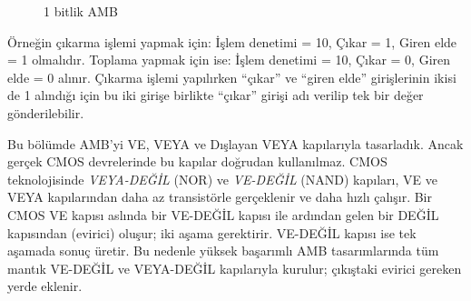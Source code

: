 \begin{figure}[htbp]
\caption{1 bitlik AMB}
\label{fig:1bit-amb}
\end{figure}

Örneğin çıkarma işlemi yapmak için: İşlem denetimi = 10, Çıkar = 1, Giren elde = 1 olmalıdır. Toplama yapmak için ise: İşlem denetimi = 10, Çıkar = 0, Giren elde = 0 alınır. Çıkarma işlemi yapılırken ``çıkar'' ve ``giren elde'' girişlerinin ikisi de 1 alındığı için bu iki girişe birlikte ``çıkar'' girişi adı verilip tek bir değer gönderilebilir.

\begin{bilginot}
Bu bölümde AMB'yi VE, VEYA ve Dışlayan VEYA kapılarıyla tasarladık. Ancak gerçek CMOS devrelerinde bu kapılar doğrudan kullanılmaz. CMOS teknolojisinde \emph{VEYA-DEĞİL} (NOR) ve \emph{VE-DEĞİL} (NAND) kapıları, VE ve VEYA kapılarından daha az transistörle gerçeklenir ve daha hızlı çalışır. Bir CMOS VE kapısı aslında bir VE-DEĞİL kapısı ile ardından gelen bir DEĞİL kapısından (evirici) oluşur; iki aşama gerektirir. VE-DEĞİL kapısı ise tek aşamada sonuç üretir. Bu nedenle yüksek başarımlı AMB tasarımlarında tüm mantık VE-DEĞİL ve VEYA-DEĞİL kapılarıyla kurulur; çıkıştaki evirici gereken yerde eklenir.
\end{bilginot}

